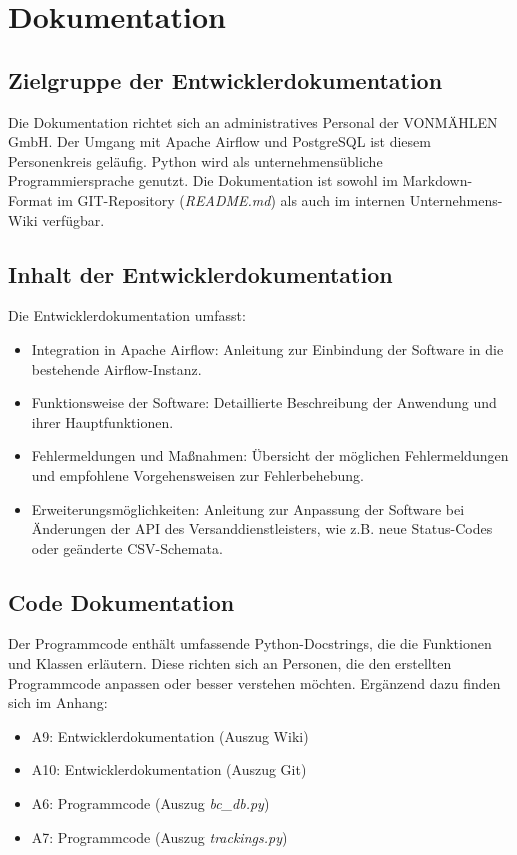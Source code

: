 \section{Dokumentation}
\label{sec:Dokumentation}


\subsection{Zielgruppe der Entwicklerdokumentation}
\label{sec:ZielgruppeDoku}

Die Dokumentation richtet sich an administratives Personal der VONMÄHLEN GmbH. 
Der Umgang mit Apache Airflow und PostgreSQL ist diesem Personenkreis geläufig. 
Python wird als unternehmensübliche Programmiersprache genutzt. Die Dokumentation ist 
sowohl im Markdown-Format im GIT-Repository (\textit{README.md}) als auch im internen Unternehmens-Wiki verfügbar.

\subsection{Inhalt der Entwicklerdokumentation}
\label{sec:Entwicklerdokumentation}

Die Entwicklerdokumentation umfasst:
\begin{itemize}
    \item Integration in Apache Airflow: Anleitung zur Einbindung der Software in die bestehende Airflow-Instanz.
    \item Funktionsweise der Software: Detaillierte Beschreibung der Anwendung und ihrer Hauptfunktionen.
    \item Fehlermeldungen und Maßnahmen: Übersicht der möglichen Fehlermeldungen und empfohlene Vorgehensweisen zur Fehlerbehebung.
    \item Erweiterungsmöglichkeiten: Anleitung zur Anpassung der Software bei Änderungen der API des Versanddienstleisters, 
    wie z.B. neue Status-Codes oder geänderte CSV-Schemata.
\end{itemize}

\subsection{Code Dokumentation}
\label{sec:CodeDokumentation}

Der Programmcode enthält umfassende Python-Docstrings, die die Funktionen und Klassen erläutern. 
Diese richten sich an Personen, die den erstellten Programmcode anpassen oder besser verstehen möchten. 
Ergänzend dazu finden sich im Anhang:
\begin{itemize}
    \item A9: Entwicklerdokumentation (Auszug Wiki)
    \item A10: Entwicklerdokumentation (Auszug Git)
    \item A6: Programmcode (Auszug \textit{bc\_db.py})
    \item A7: Programmcode (Auszug \textit{trackings.py})
\end{itemize}
